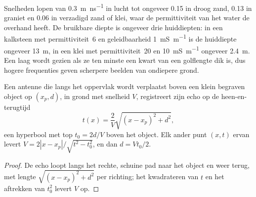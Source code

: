 Snelheden lopen van \qty{0.3}{m.ns^{-1}} in lucht tot ongeveer \num{0.15} in
droog zand, \num{0.13} in graniet en \num{0.06} in verzadigd zand of
klei, waar de permittiviteit van het water de overhand heeft. De bruikbare
diepte is ongeveer drie huiddiepten: in een kalksteen met permittiviteit~6 en
geleidbaarheid \qty{1}{mS.m^{-1}} is de huiddiepte ongeveer \qty{13}{m},
in een klei met permittiviteit~20 en \qty{10}{mS.m^{-1}} ongeveer
\qty{2.4}{m}. Een laag wordt gezien als ze ten minste een kwart van een
golflengte dik is, dus hogere frequenties geven scherpere beelden van
ondiepere grond.

\begin{proposition}[Diffractiehyperbool]\label{prop:b3:field-lab-methods-3:hyperbola}
Een antenne die langs het oppervlak wordt verplaatst boven een klein begraven object op
$(x_p, d)$, in grond met snelheid $V$, registreert zijn echo op
de heen-en-terugtijd
\[
t(x) = \frac{2}{V}\sqrt{(x - x_p)^2 + d^2} ,
\]
een hyperbool met top $t_0 = 2d/V$ boven het object. Elk ander punt
$(x, t)$ ervan levert $V = 2|x - x_p|/\sqrt{t^2 - t_0^2}$, en dan $d =
Vt_0/2$.
\end{proposition}

\begin{proof}
De echo loopt langs het rechte, schuine pad naar het object en weer terug,
met lengte $\sqrt{(x - x_p)^2 + d^2}$ per richting; het kwadrateren van $t$ en
het aftrekken van $t_0^2$ levert $V$ op.
\end{proof}

